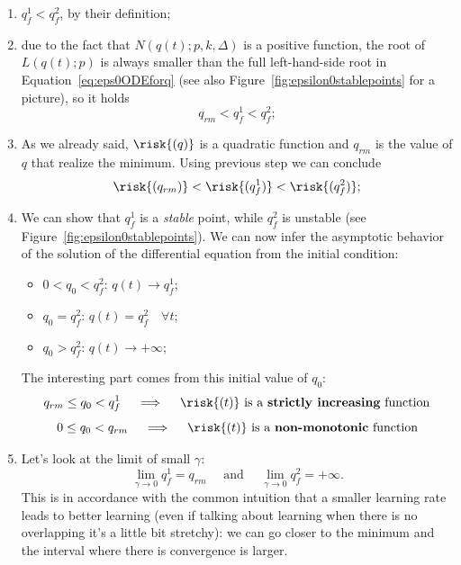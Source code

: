 \begin{enumerate}
  \item \(q_f^1 < q_f^2\), by their definition;
  \item due to the fact that \(N{(q{(t)};p,k,\Delta)}\) is a positive function,
        the root of \(L{(q{(t)};p)}\) is always smaller than the full left-hand-side
        root in Equation~\eqref{eq:eps0ODEforq} (see also Figure~\ref{fig:epsilon0stablepoints} for a picture),
        so it holds\[q_{rm}<q_f^1 < q_f^2;\]
  \item As we already said, \(\risk{(q)}\) is a quadratic function and \(q_{rm}\) is the value of \(q\) that realize the minimum. Using previous step we can conclude
  \[\risk{(q_{rm})}<\risk{(q_f^1)} < \risk{(q_f^2)};\]
  \item We can show that \(q_f^1\) is a \emph{stable} point, while \(q_f^2\) is unstable (see Figure~\ref{fig:epsilon0stablepoints}).
  We can now infer the asymptotic behavior of the solution of the differential equation from the initial condition:
        \begin{itemize}
            \item \(0<q_0<q_f^2\): \(q{(t)}\to q_f^1\);
            \item \(q_0=q_f^2\): \(q{(t)}= q_f^2 \quad \forall t\);
            \item \(q_0>q_f^2\): \(q{(t)}\to +\infty\);
        \end{itemize}
        The interesting part comes from this initial value of \(q_0\):
        \[q_{rm}\le q_0<q_f^1 \quad \implies \quad \text{\(\risk{(t)}\) is a \textbf{strictly increasing} function}\]
        \[0\le q_0<q_{rm}     \quad \implies \quad \text{\(\risk{(t)}\) is a \textbf{non-monotonic} function}\]
  \item Let's look at the limit of small \(\gamma\):
        \[\lim_{\gamma\to0}q_f^1 = q_{rm} \quad\text{ and }\quad \lim_{\gamma\to0}q_f^2 = +\infty.\]
        This is in accordance with the common intuition that a smaller learning rate leads to better learning
        (even if talking about learning when there is no overlapping it's a little bit stretchy):
        we can go closer to the minimum and the interval where there is convergence is larger.
\end{enumerate}

